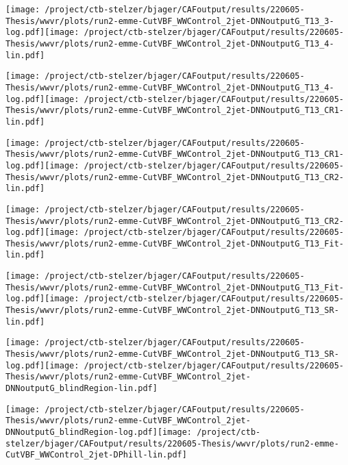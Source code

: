 \documentclass{article}
\begin{document}
\texttt{[image: /project/ctb-stelzer/bjager/CAFoutput/results/220605-Thesis/wwvr/plots/run2-emme-CutVBF\_WWControl\_2jet-DNNoutputG\_T13\_3-log.pdf]}\texttt{[image: /project/ctb-stelzer/bjager/CAFoutput/results/220605-Thesis/wwvr/plots/run2-emme-CutVBF\_WWControl\_2jet-DNNoutputG\_T13\_4-lin.pdf]}

\texttt{[image: /project/ctb-stelzer/bjager/CAFoutput/results/220605-Thesis/wwvr/plots/run2-emme-CutVBF\_WWControl\_2jet-DNNoutputG\_T13\_4-log.pdf]}\texttt{[image: /project/ctb-stelzer/bjager/CAFoutput/results/220605-Thesis/wwvr/plots/run2-emme-CutVBF\_WWControl\_2jet-DNNoutputG\_T13\_CR1-lin.pdf]}

\texttt{[image: /project/ctb-stelzer/bjager/CAFoutput/results/220605-Thesis/wwvr/plots/run2-emme-CutVBF\_WWControl\_2jet-DNNoutputG\_T13\_CR1-log.pdf]}\texttt{[image: /project/ctb-stelzer/bjager/CAFoutput/results/220605-Thesis/wwvr/plots/run2-emme-CutVBF\_WWControl\_2jet-DNNoutputG\_T13\_CR2-lin.pdf]}

\texttt{[image: /project/ctb-stelzer/bjager/CAFoutput/results/220605-Thesis/wwvr/plots/run2-emme-CutVBF\_WWControl\_2jet-DNNoutputG\_T13\_CR2-log.pdf]}\texttt{[image: /project/ctb-stelzer/bjager/CAFoutput/results/220605-Thesis/wwvr/plots/run2-emme-CutVBF\_WWControl\_2jet-DNNoutputG\_T13\_Fit-lin.pdf]}

\texttt{[image: /project/ctb-stelzer/bjager/CAFoutput/results/220605-Thesis/wwvr/plots/run2-emme-CutVBF\_WWControl\_2jet-DNNoutputG\_T13\_Fit-log.pdf]}\texttt{[image: /project/ctb-stelzer/bjager/CAFoutput/results/220605-Thesis/wwvr/plots/run2-emme-CutVBF\_WWControl\_2jet-DNNoutputG\_T13\_SR-lin.pdf]}

\texttt{[image: /project/ctb-stelzer/bjager/CAFoutput/results/220605-Thesis/wwvr/plots/run2-emme-CutVBF\_WWControl\_2jet-DNNoutputG\_T13\_SR-log.pdf]}\texttt{[image: /project/ctb-stelzer/bjager/CAFoutput/results/220605-Thesis/wwvr/plots/run2-emme-CutVBF\_WWControl\_2jet-DNNoutputG\_blindRegion-lin.pdf]}

\texttt{[image: /project/ctb-stelzer/bjager/CAFoutput/results/220605-Thesis/wwvr/plots/run2-emme-CutVBF\_WWControl\_2jet-DNNoutputG\_blindRegion-log.pdf]}\texttt{[image: /project/ctb-stelzer/bjager/CAFoutput/results/220605-Thesis/wwvr/plots/run2-emme-CutVBF\_WWControl\_2jet-DPhill-lin.pdf]}
\end{document}

